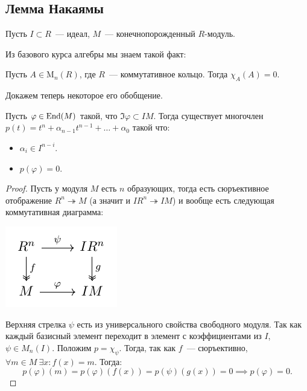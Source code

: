 	
	\subsection{Лемма Накаямы}

	Пусть $I \subset R$~--- идеал, $M$~--- конечнопорожденный $R$-модуль. 

	Из базового курса алгебры мы знаем такой факт: 

	\begin{theorem}\label{standard_GK}
		Пусть $A \in \mathrm{M}_{n}(R)$, где $R$~--- коммутативное кольцо. Тогда $\chi_{A}(A) = 0$.
	\end{theorem}

	Докажем теперь некоторое его обобщение. 

	\begin{theorem}\label{GK_theorem}
		Пусть $\varphi \in \operatorname{End}(M)$ такой, что $\Im{\varphi} \subset IM$. Тогда существует многочлен $p(t) = t^n + \alpha_{n - 1}t^{n - 1} + \ldots + \alpha_0$ такой что: 
		\begin{itemize}
			\item $\alpha_i \in I^{n - i}$.
			\item $p(\varphi) = 0$.
		\end{itemize}
	\end{theorem}



	\begin{proof}
		Пусть у модуля $M$ есть $n$ образующих, тогда есть сюръективное отображение $R^n \twoheadrightarrow M$ (а значит и $IR^n \twoheadrightarrow IM$) и вообще есть следующая коммутативная диаграмма: 
		\begin{center}
		\includegraphics{lectures/3/commutative diagramms/GK.pdf}
 		\end{center}

 		Верхняя стрелка $\psi$ есть из универсального свойства свободного модуля. Так как каждый базисный элемент переходит в элемент с коэффициентами из $I$, $\psi \in M_{n}(I)$. Положим $p = \chi_{\psi}$. Тогда, так как $f$~--- сюръективно, $\forall m \in M \ \exists x\colon f(x) = m$. Тогда:
 		\[
 			p(\varphi)(m) = p(\varphi)(f(x)) = p(\psi)(g(x)) = 0 \implies p(\varphi) = 0.
 		\]
	\end{proof}

